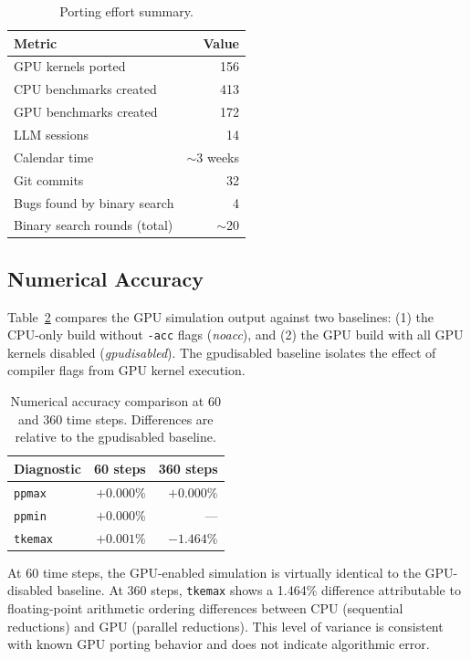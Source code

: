 \documentclass[conference]{IEEEtran}
\begin{document}
\begin{table}[t]
\centering
\caption{Porting effort summary.}
\label{tab:effort}
\begin{tabular}{lr}
\toprule
Metric & Value \\
\midrule
GPU kernels ported & 156 \\
CPU benchmarks created & 413 \\
GPU benchmarks created & 172 \\
LLM sessions & 14 \\
Calendar time & $\sim$3 weeks \\
Git commits & 32 \\
Bugs found by binary search & 4 \\
Binary search rounds (total) & $\sim$20 \\
\bottomrule
\end{tabular}
\end{table}

\subsection{Numerical Accuracy}

Table~\ref{tab:accuracy} compares the GPU simulation output against two
baselines: (1) the CPU-only build without \texttt{-acc} flags
(\emph{noacc}), and (2) the GPU build with all GPU kernels disabled
(\emph{gpudisabled}). The gpudisabled baseline isolates the effect of
compiler flags from GPU kernel execution.

\begin{table}[t]
\centering
\caption{Numerical accuracy comparison at 60 and 360 time steps.
  Differences are relative to the gpudisabled baseline.}
\label{tab:accuracy}
\begin{tabular}{lrr}
\toprule
Diagnostic & 60 steps & 360 steps \\
\midrule
\texttt{ppmax} & $+0.000$\% & $+0.000$\% \\
\texttt{ppmin} & $+0.000$\% & --- \\
\texttt{tkemax} & $+0.001$\% & $-1.464$\% \\
\bottomrule
\end{tabular}
\end{table}

At 60 time steps, the GPU-enabled simulation is virtually identical to the
GPU-disabled baseline. At 360 steps, \texttt{tkemax} shows a 1.464\%
difference attributable to floating-point arithmetic ordering differences
between CPU (sequential reductions) and GPU (parallel reductions). This
level of variance is consistent with known GPU porting behavior and does not
indicate algorithmic error.
\end{document}
